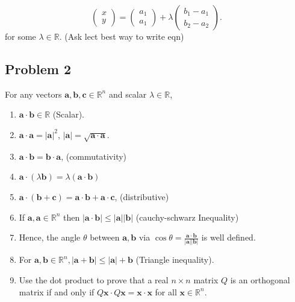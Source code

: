 \[
  \begin{pmatrix} x \\ y \end{pmatrix}  = \begin{pmatrix} a_{1}\\a_{1} \end{pmatrix}  + \lambda \begin{pmatrix} b_{1}-a_{1}\\b_{2}-a_{2} \end{pmatrix}
.\]
for some \( \lambda \in \mathbb{R} \). (Ask lect best way to write eqn)

\subsection{Problem 2}

For any vectors \( \mathbf{a}, \mathbf{b}, \mathbf{c} \in \mathbb{R}^{n}   \) and scalar \( \lambda \in \mathbb{R} \),
\begin{enumerate}
  \item \( \mathbf{a} \cdot \mathbf{b} \in \mathbb{R} \) (Scalar).
  \item \( \mathbf{a} \cdot \mathbf{a} = |\mathbf{a} |^{2} \), \( |\mathbf{a} | = \sqrt{\mathbf{a}\cdot \mathbf{a}} \).
  \item \( \mathbf{a} \cdot \mathbf{b} = \mathbf{b} \cdot \mathbf{a} \), (commutativity)
  \item \( \mathbf{a} \cdot (\lambda \mathbf{b}) = \lambda \left( \mathbf{a} \cdot \mathbf{b} \right)  \)
  \item \( \mathbf{a} \cdot \left( \mathbf{b} + \mathbf{c} \right) = \mathbf{a} \cdot \mathbf{b} + \mathbf{a} \cdot \mathbf{c} \), (distributive)
  \item If \( \mathbf{a}, \mathbf{a} \in  \mathbb{R}^{n}\) then \( |\mathbf{a} \cdot \mathbf{b}| \le | \mathbf{a} | |\mathbf{b} |\)  (cauchy-schwarz Inequality)
  \item Hence, the angle \( \theta  \) between \( \mathbf{a}, \mathbf{b} \) via \( \cos \theta  = \frac{\mathbf{a}\cdot \mathbf{b}}{| \mathbf{a}| |\mathbf{b} |} \) is well defined.
  \item For \( \mathbf{a}, \mathbf{b} \in \mathbb{R}^{n}, |\mathbf{a} + \mathbf{b} | \le |\mathbf{a} | + \mathbf{b}\)  (Triangle inequality).
  \item Use the dot product to prove that a real \( n \times n  \) matrix \( Q \) is an orthogonal matrix
    if and only if \( Q \mathbf{x} \cdot Q\mathbf{x} = \mathbf{x} \cdot \mathbf{x}  \) for all \( \mathbf{x} \in \mathbb{R}^{n} \).
\end{enumerate}

